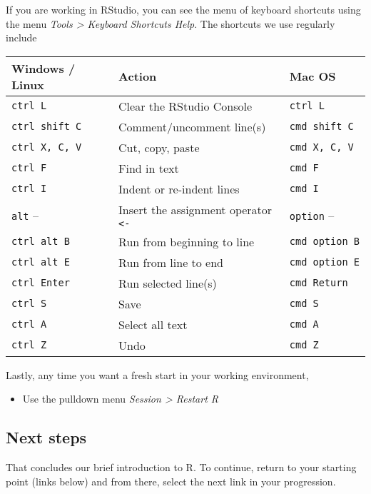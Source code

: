 \documentclass[
]{book}
\providecommand{\tightlist}{%
  \setlength{\itemsep}{0pt}\setlength{\parskip}{0pt}}
\begin{document}
If you are working in RStudio, you can see the menu of keyboard
shortcuts using the menu \emph{Tools \textgreater{} Keyboard Shortcuts Help}. The
shortcuts we use regularly include

\begin{longtable}[]{@{}lll@{}}
\toprule
Windows / Linux & Action & Mac OS \\
\midrule
\endhead
\texttt{ctrl\ L} & Clear the RStudio Console & \texttt{ctrl\ L} \\
\texttt{ctrl\ shift\ C} & Comment/uncomment line(s) & \texttt{cmd\ shift\ C} \\
\texttt{ctrl\ X,\ C,\ V} & Cut, copy, paste & \texttt{cmd\ X,\ C,\ V} \\
\texttt{ctrl\ F} & Find in text & \texttt{cmd\ F} \\
\texttt{ctrl\ I} & Indent or re-indent lines & \texttt{cmd\ I} \\
\texttt{alt} -- & Insert the assignment operator \texttt{\textless{}-} & \texttt{option} -- \\
\texttt{ctrl\ alt\ B} & Run from beginning to line & \texttt{cmd\ option\ B} \\
\texttt{ctrl\ alt\ E} & Run from line to end & \texttt{cmd\ option\ E} \\
\texttt{ctrl\ Enter} & Run selected line(s) & \texttt{cmd\ Return} \\
\texttt{ctrl\ S} & Save & \texttt{cmd\ S} \\
\texttt{ctrl\ A} & Select all text & \texttt{cmd\ A} \\
\texttt{ctrl\ Z} & Undo & \texttt{cmd\ Z} \\
\bottomrule
\end{longtable}

Lastly, any time you want a fresh start in your working environment,

\begin{itemize}
\tightlist
\item
  Use the pulldown menu \emph{Session \textgreater{} Restart R}
\end{itemize}

\hypertarget{next-steps}{%
\subsection{Next steps}\label{next-steps}}

That concludes our brief introduction to R. To continue, return to your starting point (links below) and from there, select the next link in your progression.
\end{document}
